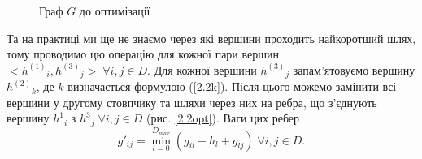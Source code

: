 \documentclass{ConfFTI}
\begin{document}
\begin{figure}[h!]
	\caption{Граф $G$ до оптимізації}
	\label{2.2noopt}
\end{figure}

Та на практиці ми ще не знаємо через які вершини проходить найкоротший шлях, тому проводимо цю операцію для кожної пари вершин $<{h^{(1)}}_i , {h^{(3)}}_j> \; \forall i,j \in D$. Для кожної вершини ${h^{(3)}}_{j}$ запам'ятовуємо вершину ${h^{(2)}}_{k}$, де $k$ визначається формулою (\ref{2.2k}). Після цього можемо замінити всі вершини у другому стовпчику та шляхи через них на ребра, що з'єднують вершину ${h^1}_i$ з ${h^3}_j \; \forall i,j \in D$ (рис. \ref{2.2opt}). Ваги цих ребер
$$g'_{ij} = \min\limits_{l=0}^{D_{max}} (g_{il} + h_{l} + g_{lj}) \; \forall i,j \in D.$$
\end{document}

